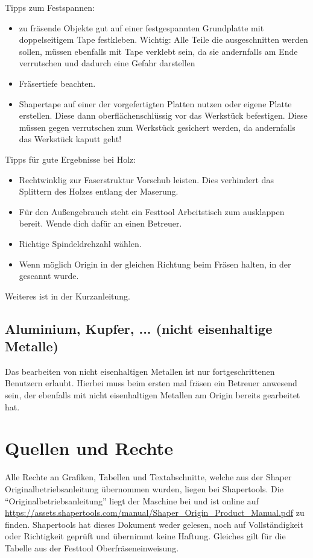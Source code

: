 \documentclass{\basedir/fablab-document}
\begin{document}
Tipps zum Festspannen:
\begin{itemize}
    \item zu fräsende Objekte gut auf einer festgespannten Grundplatte mit doppelseitigem Tape festkleben. Wichtig: Alle Teile die ausgeschnitten werden sollen, müssen ebenfalls mit Tape verklebt sein, da sie andernfalls am Ende verrutschen und dadurch eine Gefahr darstellen
    \item Fräsertiefe beachten.
    \item Shapertape auf einer der vorgefertigten Platten nutzen oder eigene Platte erstellen. Diese dann oberflächenschlüssig vor das Werkstück befestigen. Diese müssen gegen verrutschen zum Werkstück gesichert werden, da andernfalls das Werkstück kaputt geht!
\end{itemize}

Tipps für gute Ergebnisse bei Holz:
\begin{itemize}
    \item Rechtwinklig zur Faserstruktur Vorschub leisten. Dies verhindert das Splittern des Holzes entlang der Maserung.
    \item Für den Außengebrauch steht ein Festtool Arbeitstisch zum ausklappen bereit. Wende dich dafür an einen Betreuer.
    \item Richtige Spindeldrehzahl wählen.
    \item Wenn möglich Origin in der gleichen Richtung beim Fräsen halten, in der gescannt wurde.
\end{itemize}

Weiteres ist in der Kurzanleitung.

\subsection{Aluminium, Kupfer, ... (nicht eisenhaltige Metalle)}
Das bearbeiten von nicht eisenhaltigen Metallen ist nur fortgeschrittenen
Benutzern erlaubt. Hierbei muss beim ersten mal fräsen ein Betreuer anwesend
sein, der ebenfalls mit nicht eisenhaltigen Metallen am Origin bereits gearbeitet hat.

\section{Quellen und Rechte}
\label{quellen}
Alle Rechte an Grafiken, Tabellen und Textabschnitte, welche aus der Shaper
Originalbetriebsanleitung übernommen wurden, liegen bei Shapertools. Die
\enquote{Originalbetriebsanleitung} liegt der Maschine bei und ist online auf
\url{https://assets.shapertools.com/manual/Shaper_Origin_Product_Manual.pdf}
zu finden. Shapertools hat dieses Dokument weder gelesen, noch auf Vollständigkeit
oder Richtigkeit geprüft und übernimmt keine Haftung.
Gleiches gilt für die Tabelle aus der Festtool Oberfräseneinweisung.
\end{document}
